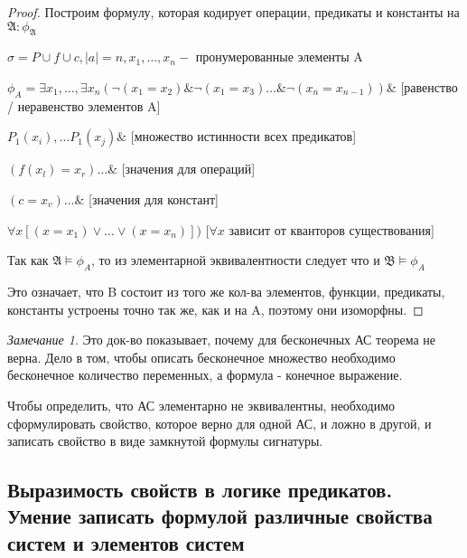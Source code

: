 \documentclass[a4paper]{article}
\theoremstyle{definition}
\theoremstyle{remark}
\newtheorem*{remark}{Замечание}
\begin{document}
    \begin{proof}
        Построим формулу, которая кодирует операции, предикаты и константы на $\mathfrak{A} : \phi_\mathfrak{A}$
        
        $\sigma = P\cup f\cup c, |a| = n, x_1, \dots, x_n - $ пронумерованные элементы A
        
        $\phi_A = \exists x_1, \dots, \exists x_n (\neg(x_1 = x_2) \& \neg (x_1 = x_3) \dots \& \neg (x_n = x_{n-1})) \&$ [равенство / неравенство элементов A]

        $P_1(x_i), \dots P_1(x_j) \&$ [множество истинности всех предикатов]

        $(f(x_l) = x_r) \dots\&$ [значения для операций]

        $(c = x_v)\dots\&$ [значения для констант]

        $\forall x[(x = x_1) \vee \dots \vee (x = x_n)])$ [$\forall x$ зависит от кванторов существования]

        Так как $\mathfrak{A}\models \phi_A$, то из элементарной эквивалентности следует что и $\mathfrak{B} \models \phi_A$

        Это означает, что B состоит из того же кол-ва элементов, функции, предикаты, константы устроены точно так же, как и на A, поэтому они изоморфны.
    \end{proof}
    \begin{remark}
        Это док-во показывает, почему для бесконечных АС теорема не верна. Дело в том, чтобы описать бесконечное множество
        необходимо бесконечное количество переменных, а формула - конечное выражение.
    \end{remark}

    Чтобы определить, что АС элементарно не эквивалентны, необходимо сформулировать свойство, которое верно для одной АС, и ложно в другой,
    и записать свойство в виде замкнутой формулы сигнатуры.
    \subsection{Выразимость свойств в логике предикатов. Умение записать формулой различные свойства систем и элементов систем}
\end{document}
